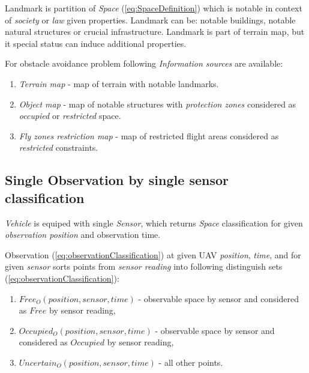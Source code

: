     \begin{definition}{Landmark}\label{def:Landmark} 
        is partition of \emph{Space} (\ref{eq:SpaceDefinition}) which is notable in context of \emph{society} or \emph{law} given properties. Landmark can be: notable buildings, notable natural structures or crucial infrastructure. Landmark is part of terrain map, but it special status can induce additional properties.
    \end{definition}

    \noindent For obstacle avoidance problem following \emph{Information sources} are available:
    
    \begin{enumerate}
        \item\emph{Terrain map} - map of terrain with notable landmarks.
        \item\emph{Object map} - map of notable structures with \emph{protection zones} considered as \emph{occupied} or \emph{restricted} space.
        \item\emph{Fly zones restriction map} - map of restricted flight areas considered as \emph{restricted} constraints.
    \end{enumerate}

\newpage
\subsection{Single Observation by single sensor classification} \label{singleObservationSingle sensor}
    \noindent\emph{Vehicle} is equiped with single \emph{Sensor}, which returns \emph{Space} classification for given \emph{observation position} and observation time.


    Observation (\ref{eq:observationClassification}) at given UAV \emph{position}, \emph{time}, and for given \emph{sensor} sorts points from \emph{sensor reading} into following distinguish sets (\ref{eq:observationClassification}):
    
    \begin{enumerate}
        \item $Free_O(position,sensor,time)$ - observable space by sensor and considered as $Free$ by sensor reading,
        \item $Occupied_O(position,sensor,time)$ -  observable space by sensor and considered as $Occupied$ by sensor reading,
        \item $Uncertain_O(position,sensor,time)$ - all other points.
    \end{enumerate}
    
